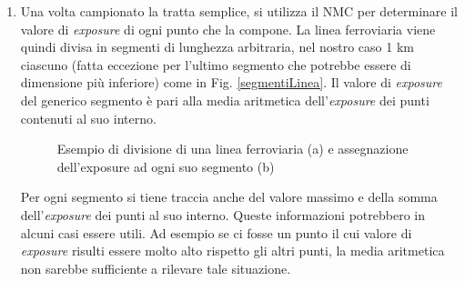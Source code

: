 \begin{enumerate}
\item Una volta campionato la tratta semplice, si utilizza il NMC per determinare il valore di \textit{exposure} di ogni punto che la compone. \newline
La linea ferroviaria viene quindi divisa in segmenti di lunghezza arbitraria, nel nostro caso 1 km ciascuno (fatta eccezione per l'ultimo segmento che potrebbe essere di dimensione più inferiore) come in Fig. \ref{segmentiLinea}. Il valore di \textit{exposure}  del generico segmento è pari alla media aritmetica dell'\textit{exposure} dei punti contenuti al suo interno.

\begin{figure}[bth]
	\myfloatalign
	 \quad
	\caption[dove]{Esempio di divisione di una linea ferroviaria (a) e assegnazione dell'exposure  ad ogni suo segmento (b) }
	\label{fig:aggregazioneLinea}
\end{figure}

Per ogni segmento si tiene traccia anche del valore massimo e della somma dell'\textit{exposure} dei punti al suo interno. Queste informazioni potrebbero in alcuni casi essere utili. Ad esempio se ci fosse un punto il cui valore di \textit{exposure} risulti essere molto alto rispetto gli altri punti, la media aritmetica non sarebbe sufficiente a rilevare tale situazione. 

\end{enumerate}
